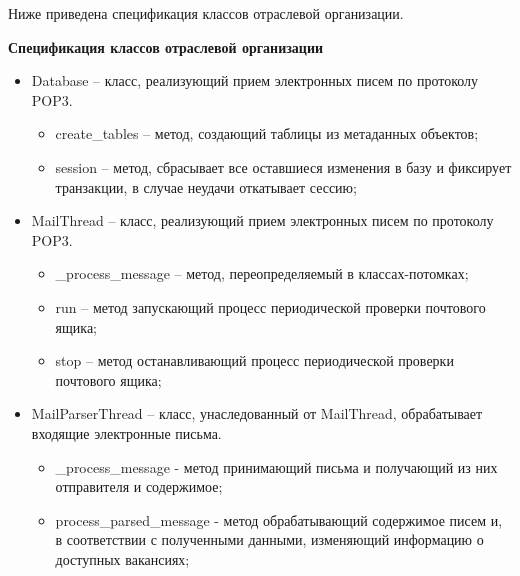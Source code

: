 Ниже приведена спецификация классов отраслевой организации.

\textbf{Спецификация классов отраслевой организации}
\begin{itemize}
\item Database – класс, реализующий прием электронных писем по протоколу POP3.
	\begin{itemize}
	\item create_tables – метод, создающий таблицы из метаданных объектов;
	\item session – метод, сбрасывает все оставшиеся изменения в базу и фиксирует транзакции, в случае неудачи откатывает сессию;
	\end{itemize}	
\item MailThread – класс, реализующий прием электронных писем по протоколу POP3.
	\begin{itemize}
	\item _process_message – метод, переопределяемый в классах-потомках;                                                                   
	\item run – метод запускающий процесс периодической проверки почтового ящика;
	\item stop – метод останавливающий процесс периодической проверки почтового ящика;
	\end{itemize}
\item MailParserThread – класс, унаследованный от MailThread, обрабатывает входящие электронные письма.
	\begin{itemize}
	\item _process_message - метод принимающий письма и получающий из них отправителя и содержимое;     
	\item \underline{ }\underline{ }process_parsed_message - метод обрабатывающий содержимое писем и, в соответствии с полученными данными, изменяющий информацию о доступных вакансиях;
	\end{itemize}
	
\end{itemize}

